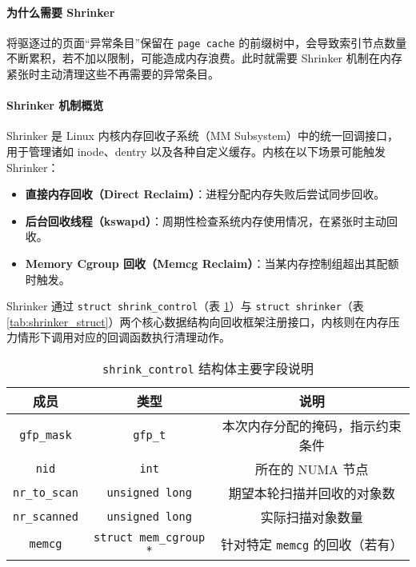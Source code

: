 \paragraph{为什么需要 Shrinker}

将驱逐过的页面“异常条目”保留在 \texttt{page cache} 的前缀树中，会导致索引节点数量不断累积，若不加以限制，可能造成内存浪费。此时就需要 Shrinker 机制在内存紧张时主动清理这些不再需要的异常条目。

\paragraph{Shrinker 机制概览}

Shrinker 是 Linux 内核内存回收子系统（MM Subsystem）中的统一回调接口，用于管理诸如 inode、dentry 以及各种自定义缓存。内核在以下场景可能触发 Shrinker：
\begin{itemize}
  \item \textbf{直接内存回收（Direct Reclaim）}：进程分配内存失败后尝试同步回收。
  \item \textbf{后台回收线程（kswapd）}：周期性检查系统内存使用情况，在紧张时主动回收。
  \item \textbf{Memory Cgroup 回收（Memcg Reclaim）}：当某内存控制组超出其配额时触发。
\end{itemize}
Shrinker 通过 \texttt{struct shrink\_control}（表 \ref{tab:shrink_control_struct}）与 \texttt{struct shrinker}（表 \ref{tab:shrinker_struct}）两个核心数据结构向回收框架注册接口，内核则在内存压力情形下调用对应的回调函数执行清理动作。

\begin{table}[htbp]
  \centering
  \caption{\texttt{shrink\_control} 结构体主要字段说明}
  \label{tab:shrink_control_struct}
  \begin{tabular}{ccc}
    \toprule
    \textbf{成员} & \textbf{类型} & \textbf{说明} \\
    \midrule
    \texttt{gfp\_mask} & \texttt{gfp\_t} & 本次内存分配的掩码，指示约束条件 \\
    \texttt{nid} & \texttt{int} & 所在的 NUMA 节点 \\
    \texttt{nr\_to\_scan} & \texttt{unsigned long} & 期望本轮扫描并回收的对象数 \\
    \texttt{nr\_scanned} & \texttt{unsigned long} & 实际扫描对象数量 \\
    \texttt{memcg} & \texttt{struct mem\_cgroup *} & 针对特定 \texttt{memcg} 的回收（若有） \\
    \bottomrule
  \end{tabular}
\end{table}


